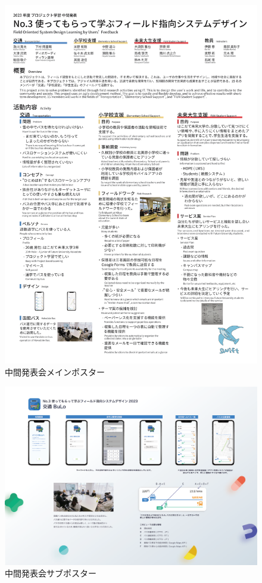 \begin{figure}[H]
    \centering
    \includegraphics[width=14cm]{images/interim_poster.png}
    \caption{中間発表会メインポスター}
    \label{fig:interim_poster}
\end{figure}

\begin{figure}[H]
    \centering
    \includegraphics[width=14cm]{images/interim_poster_bulo.png}
    \caption{中間発表会サブポスター}
    \label{fig:interim_poster_bulo}
\end{figure}

